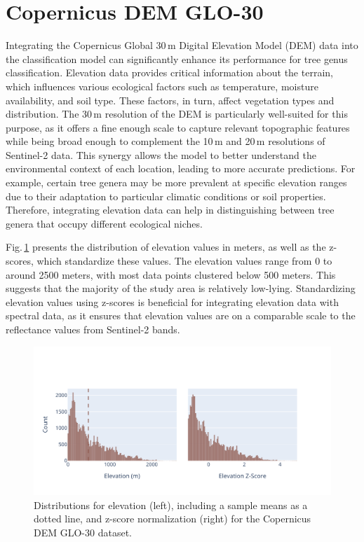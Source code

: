 \section{Copernicus DEM GLO-30}

Integrating the Copernicus Global 30\,m Digital Elevation Model (DEM) data into the classification model can significantly enhance its performance for tree genus classification. Elevation data provides critical information about the terrain, which influences various ecological factors such as temperature, moisture availability, and soil type. These factors, in turn, affect vegetation types and distribution. The 30\,m resolution of the DEM is particularly well-suited for this purpose, as it offers a fine enough scale to capture relevant topographic features while being broad enough to complement the 10\,m and 20\,m resolutions of Sentinel-2 data. This synergy allows the model to better understand the environmental context of each location, leading to more accurate predictions. For example, certain tree genera may be more prevalent at specific elevation ranges due to their adaptation to particular climatic conditions or soil properties. Therefore, integrating elevation data can help in distinguishing between tree genera that occupy different ecological niches.

Fig.\,\ref{fig:elevation_hist} presents the distribution of elevation values in meters, as well as the z-scores, which standardize these values. The elevation values range from 0 to around 2500 meters, with most data points clustered below 500 meters. This suggests that the majority of the study area is relatively low-lying. Standardizing elevation values using z-scores is beneficial for integrating elevation data with spectral data, as it ensures that elevation values are on a comparable scale to the reflectance values from Sentinel-2 bands. 

\begin{figure}[ht]
    \centering
    \includegraphics[width=0.98\linewidth, trim={15pt 25pt 10pt 50pt}, clip]{figures/figures_features/elevation_hist.pdf}
    \caption{Distributions for elevation (left), including a sample means as a dotted line, 
    and z-score normalization (right) for the Copernicus DEM GLO-30 dataset.}
    \label{fig:elevation_hist}
\end{figure}


